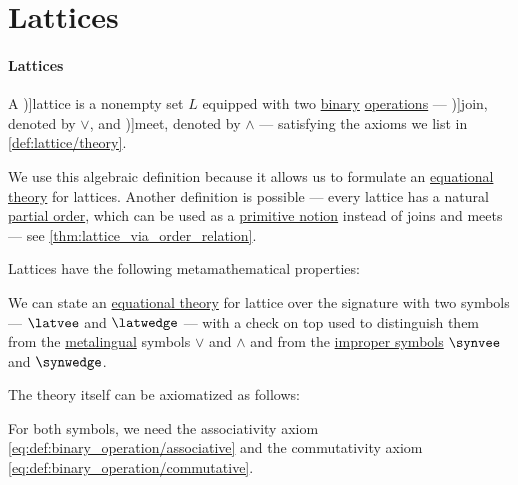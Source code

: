 \section{Lattices}\label{sec:lattices}

\paragraph{Lattices}

\begin{definition}\label{def:lattice}
  A \term[ru=решётка, en=lattice (\cite[12]{Grätzer2011LatticeTheory})]{lattice} is a nonempty set \( L \) equipped with two \hyperref[def:operation_arity_terminology]{binary} \hyperref[def:operation_on_set]{operations} --- \term[ru=объединение, en=join (\cite[12]{Grätzer2011LatticeTheory})]{join}, denoted by \( \vee \), and \term[ru=пересечение, en=meet (\cite[12]{Grätzer2011LatticeTheory})]{meet}, denoted by \( \wedge \) --- satisfying the axioms we list in \cref{def:lattice/theory}.

  We use this algebraic definition because it allows us to formulate an \hyperref[def:fol_equational_theory]{equational theory} for lattices. Another definition is possible --- every lattice has a natural \hyperref[def:partially_ordered_set]{partial order}, which can be used as a \hyperref[con:primitive_notion]{primitive notion} instead of joins and meets --- see \cref{thm:lattice_via_order_relation}.

  Lattices have the following metamathematical properties:
  \begin{thmenum}
    \mimprovised We can state an \hyperref[def:fol_equational_theory]{equational theory} for lattice over the signature with two symbols --- \( \latvee \) and \( \latwedge \) --- with a check on top used to distinguish them from the \hyperref[con:metalanguage]{metalingual} symbols \( \vee \) and \( \wedge \) and from the \hyperref[con:improper_symbol]{improper symbols} \( \synvee \) and \( \synwedge \).

    The theory itself can be axiomatized as follows:
    \begin{thmenum}[series=def:lattice]
       For both symbols, we need the associativity axiom \eqref{eq:def:binary_operation/associative} and the commutativity axiom \eqref{eq:def:binary_operation/commutative}.


\end{thmenum}
\end{thmenum}
\end{definition}
